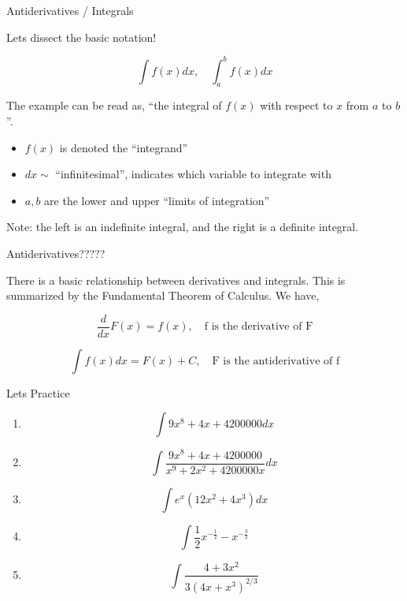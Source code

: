 \documentclass{beamer}
\begin{document}
\begin{frame}{Antiderivatives / Integrals}

    Lets dissect the basic notation!

    \[
        \int f(x) dx, \quad \int_a^b f(x) dx
    \]
    
    The example can be read as, ``the integral of $f(x)$ with respect to $x$ from $a$ to $b$''.

    \begin{itemize}

        \item $f(x)$ is denoted the ``integrand''

        \item $dx \sim$ ``infinitesimal'', indicates which variable to integrate with

        \item $a, b$ are the lower and upper ``limits of integration''

    \end{itemize}

    Note: the left is an indefinite integral, and the right is a definite integral.

\end{frame}


\begin{frame}{Antiderivatives?????}

    There is a basic relationship between derivatives and integrals. This is summarized by the Fundamental Theorem of Calculus. We have, 
    
    \[
        \frac{d}{dx} F(x) = f(x), \quad \text{f is the derivative of F}
    \]

    \[
        \int f(x) dx = F(x) + C, \quad \text{F is the antiderivative of f}
    \]

\end{frame}

\begin{frame}{Lets Practice}

    \begin{enumerate}

        \item \[\int 9x^8 + 4x + 4200000 dx\]

        \item \[\int \frac{9x^8 + 4x + 4200000}{x^9 + 2x^2 + 4200000x}dx\]

        \item \[\int e^x\left(12x^2 + 4x^3\right)dx\]
    
        \item \[\int \frac{1}{2}x^{-\frac{1}{2}} - x^{-\frac{3}{2}}\]

        \item \[\int \frac{4 + 3x^2}{3\left(4x + x^3\right)^{2/3}}\]

    \end{enumerate}

\end{frame}
\end{document}
